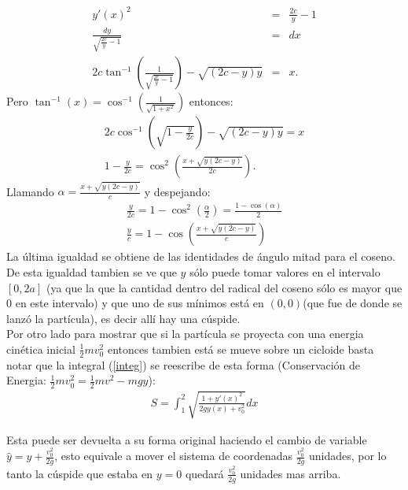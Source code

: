 \documentclass[letterpaper,10pt]{article}
\begin{document}
\begin{eqnarray}
 y'(x)^2&=&\frac{2c}{y}-1\\
\frac{dy}{\sqrt{\frac{2c}{y}-1}}&=&dx\\
 2 c \tan ^{-1}\left(\frac{1}{\sqrt{\frac{2
   c}{y}-1}}\right)-\sqrt{(2 c-y) y}  &=&x.
\end{eqnarray}
Pero $\tan^{-1}(x)=\cos^{-1}(\frac{1}{\sqrt{1+x^2}})$ entonces:
\begin{eqnarray}
2 c \cos ^{-1}\left(\sqrt{1-\frac{y}{2
   c}}\right)-\sqrt{(2 c-y) y}=x\\
1-\frac{y}{2c}=\cos^2\left(\frac{x+\sqrt{y(2c-y)}}{2c}\right).
\end{eqnarray}
Llamando $\alpha=\frac{x+\sqrt{y(2c-y)}}{c}$ y despejando:
\begin{eqnarray}
\frac{y}{2c}=1-\cos^2\left(\frac{\alpha}{2}\right)=\frac{1-\cos(\alpha)}{2}\\
\frac{y}{c}=1-\cos\left(\frac{x+\sqrt{y(2c-y)}}{c} \right)
\end{eqnarray}
La \'ultima igualdad se obtiene de las identidades de \'angulo mitad para el coseno.
De esta igualdad tambien se ve que $y$ s\'olo puede tomar valores en el intervalo $[0,2a]$ (ya que la que la cantidad dentro del radical del coseno s\'olo es mayor que 0 en este intervalo) y que uno de sus m\'inimos est\'a en $(0,0)$(que fue de donde se lanz\'o la part\'icula), es decir all\'i hay una c\'uspide.\\
Por otro lado para mostrar que si la part\'icula se proyecta con una energia cin\'etica inicial $\frac{1}{2}m v_0^2$ entonces tambien est\'a se mueve sobre un cicloide basta notar que la integral (\ref{integ}) se reescribe de esta forma (Conservaci\'on de Energia: $\frac{1}{2}m v_0^2=\frac{1}{2} mv^2-mgy$):
\begin{eqnarray}
S=\int_1^2 \sqrt{\frac{1+y'(x)^2}{2 g y(x)+v_0^2}}dx
\end{eqnarray}

Esta puede ser devuelta a su forma original haciendo el cambio de variable $\hat y=y+\frac{v_0^2}{2g}$, esto equivale a mover el sistema de coordenadas $\frac{v_0^2}{2g}$ unidades, por lo tanto la c\'uspide que estaba en $y=0$ quedar\'a $\frac{v_0^2}{2g}$ unidades mas arriba.
\end{document}
